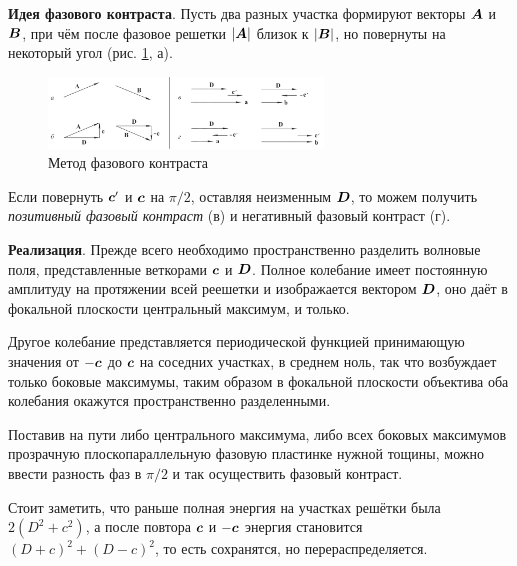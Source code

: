 







\textbf{Идея фазового контраста}. Пусть два разных участка формируют векторы $\mbox{\boldmath $A$}$ и $\mbox{\boldmath $B$}$, при чём после фазовое решетки $|\mbox{\boldmath $A$}|$ близок к $|\mbox{\boldmath $B$}|$, но повернуты на некоторый угол (рис. \ref{fig:pfc59}, а).
\begin{figure}[ht]
    \centering
    \includegraphics[width=0.65\textwidth]{figures/59_1.png}
    \caption{Метод фазового контраста}
    \label{fig:pfc59}
\end{figure}
Если повернуть $\mbox{\boldmath $c$}'$ и $\mbox{\boldmath $c$}$ на $\pi/2$, оставляя неизменным $\mbox{\boldmath $D$}$, то можем получить \textit{позитивный фазовый контраст} (в) и негативный фазовый контраст (г). 



\textbf{Реализация}. Прежде всего необходимо пространственно разделить волновые поля, представленные веткорами $\mbox{\boldmath $c$}$ и $\mbox{\boldmath $D$}$. Полное колебание имеет постоянную амплитуду на протяжении всей реешетки  и изображается вектором $\mbox{\boldmath $D$}$, оно даёт в фокальной плоскости центральный максимум, и только. 

Другое колебание представляется периодической функцией принимающую значения от $-\mbox{\boldmath $c$}$ до $\mbox{\boldmath $c$}$ на соседних участках, в среднем ноль, так что возбуждает только боковые максимумы, таким образом в фокальной плоскости объектива оба колебания окажутся пространственно разделенными. 

Поставив на пути либо центрального максимума, либо всех боковых максимумов прозрачную плоскопараллельную фазовую пластинке нужной тощины, можно ввести разность фаз в $\pi/2$ и так осуществить фазовый контраст. 


Стоит заметить, что раньше полная энергия на участках решётки была $2(D^2 + c^2)$, а после повтора $\mbox{\boldmath $c$}$ и $-\mbox{\boldmath $c$}$ энергия становится $(D+c)^2 + (D-c)^2$, то есть сохранятся, но перераспределяется. 





